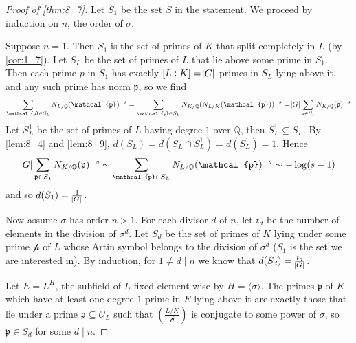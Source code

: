 \documentclass[11pt]{article}
\theoremstyle{definition}
\theoremstyle{plain}
\theoremstyle{remark}
\newcommand{\QQ}{\mathbb{Q}}
\newcommand{\cO}{\mathcal{O}}
\newcommand{\cp}{\mathcal{p}}
\newcommand{\fp}{\mathfrak{p}}
\newcommand{\leg}[2]{\left(\frac{#1}{#2}\right)}
\begin{document}
\begin{proof}[Proof of \autoref{thm:8_7}]
    Let $S_1$ be the set $S$ in the statement.
    We proceed by induction on $n$, the order of $\sigma$.

    Suppose $n = 1$. Then $S_1$ is the set of primes of $K$ that split completely in $L$ (by \autoref{cor:1_7}). Let $S_L$ be the set of primes of $L$ that lie above some prime in $S_1$. Then each prime $p$ in $S_1$ has exactly $[L:K] = \abs{G}$ primes in $S_L$ lying above it, and any such prime has norm $\fp$, so we find
    \begin{equation*}
        \sum_{\cp \in S_L} N_{L/\QQ}(\cp)^{-s}
        = \sum_{\cp \in S_L} N_{K/\QQ}(N_{L/K}(\cp))^{-s}
        = \abs{G} \sum_{\fp \in S_1} N_{K/\QQ}(\fp)^{-s}
    \end{equation*}
    Let $S_L^1$ be the set of primes of $L$ having degree $1$ over $\QQ$, then $S_L^1 \subseteq S_L$. By \autoref{lem:8_4} and \autoref{lem:8_9}, $d(S_L) = d(S_L \cap S_L^1) = d(S_L^1) = 1$. Hence
    \begin{equation*}
        \abs{G} \sum_{\fp \in S_1} N_{K/\QQ}(\fp)^{-s} \sim \sum_{\cp \in S_L} N_{L/\QQ}(\cp)^{-s} \sim -\log(s-1)
    \end{equation*}
    and so $d(S_1) = \frac{1}{\abs{G}}$.

    Now assume $\sigma$ has order $n > 1$. For each divisor $d$ of $n$, let $t_d$ be the number of elements in the division of $\sigma^d$. Let $S_d$ be the set of primes of $K$ lying under some prime $\cp$ of $L$ whose Artin symbol belongs to the division of $\sigma^d$ ($S_1$ is the set we are interested in). By induction, for $1 \neq d \mid n$ we know that $d(S_d) = \frac{t_d}{\abs{G}}$.

    Let $E = L^H$, the subfield of $L$ fixed element-wise by $H = \langle \sigma \rangle$. The primes $\fp$ of $K$ which have at least one degree $1$ prime in $E$ lying above it are exactly those that lie under a prime $\fp \subseteq \cO_L$ such that $\leg{L/K}{\cp}$ is conjugate to some power of $\sigma$, so $\fp \in S_d$ for some $d \mid n$.


\end{proof}
\end{document}
